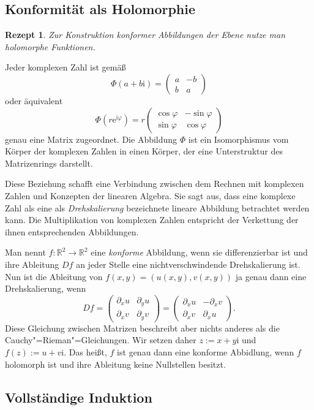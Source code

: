 \documentclass[a4paper,10pt,fleqn,twocolumn,twoside,dvipdfmx]{scrartcl}
\theoremstyle{rmbox}
\newtheorem{Rezept}{Rezept}[section]
\newcommand{\ee}{\mathrm{e}}
\newcommand{\ui}{\mathrm{i}}
\newcommand{\R}{\mathbb R}
\begin{document}
\subsection{Konformität als Holomorphie}

\begin{Rezept}
Zur Konstruktion konformer Abbildungen der Ebene
nutze man holomorphe Funktionen.
\end{Rezept}

\noindent
Jeder komplexen Zahl ist gemäß
\[\Phi(a+b\ui) = \begin{pmatrix}a & -b\\ b & a\end{pmatrix}\]
oder äquivalent
\[\Phi(r\ee^{\ui\varphi}) = r\begin{pmatrix}
\cos\varphi & -\sin\varphi\\
\sin\varphi & \cos\varphi
\end{pmatrix}\]
genau eine Matrix zugeordnet. Die Abbildung $\Phi$ ist ein
Isomorphismus vom Körper der komplexen Zahlen in einen Körper,
der eine Unterstruktur des Matrizenrings darstellt.

Diese Beziehung schafft eine Verbindung zwischen dem
Rechnen mit komplexen Zahlen und Konzepten der linearen Algebra.
Sie sagt aus, dass eine komplexe Zahl als eine als \emph{Drehskalierung}
bezeichnete lineare Abbildung betrachtet werden kann. Die Multiplikation
von komplexen Zahlen entspricht der Verkettung der ihnen entsprechenden
Abbildungen.

Man nennt $f\colon\R^2\to\R^2$ eine \emph{konforme} Abbildung, wenn sie
differenzierbar ist und ihre Ableitung $Df$ an jeder Stelle
eine nichtverschwindende Drehskalierung ist. Nun ist die
Ableitung von $f(x,y)=(u(x,y),v(x,y))$ ja genau dann eine
Drehskalierung, wenn
\[Df = \begin{pmatrix}
\partial_x u & \partial_y u\\
\partial_x v & \partial_y v
\end{pmatrix} = \begin{pmatrix}
\partial_x u & -\partial_x v\\
\partial_x v & \partial_x u
\end{pmatrix}.\]
Diese Gleichung zwischen Matrizen beschreibt aber nichts anderes als
die Cauchy"=Rieman"=Gleichungen. Wir setzen daher $z:=x+y\ui$ und
$f(z):=u+v\ui$. Das heißt, $f$ ist genau dann eine konforme
Abbidlung, wenn $f$ holomorph ist und ihre Ableitung keine
Nullstellen besitzt.

\subsection{Vollständige Induktion}
\end{document}
